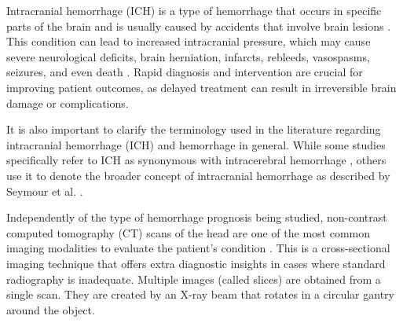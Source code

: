 
Intracranial hemorrhage (ICH) is a type of hemorrhage that occurs in specific parts of the brain and is usually caused by accidents that involve brain lesions \cite{brain-dataset}. This condition can lead to increased intracranial pressure, which may cause severe neurological deficits, brain herniation, infarcts, rebleeds, vasospasms, seizures, and even death \cite{tenny_intracranial_2024}. Rapid diagnosis and intervention are crucial for improving patient outcomes, as delayed treatment can result in irreversible brain damage or complications.


It is also important to clarify the terminology used in the literature regarding intracranial hemorrhage (ICH) and hemorrhage in general. While some studies specifically refer to ICH as synonymous with intracerebral hemorrhage \cite{Nag2023, Thabarsa2023299}, others use it to denote the broader concept of intracranial hemorrhage as described by Seymour et al. \cite{Seymour2022}.



Independently of the type of hemorrhage prognosis being studied, non-contrast computed tomography (CT) scans of the head are one of the most common imaging modalities to evaluate the patient's condition \cite{tenny_intracranial_2024}. This is a cross-sectional imaging technique that offers extra diagnostic insights in cases where standard radiography is inadequate. Multiple images (called slices) are obtained from a single scan. They are created by an X-ray beam that rotates in a circular gantry around the object. 

